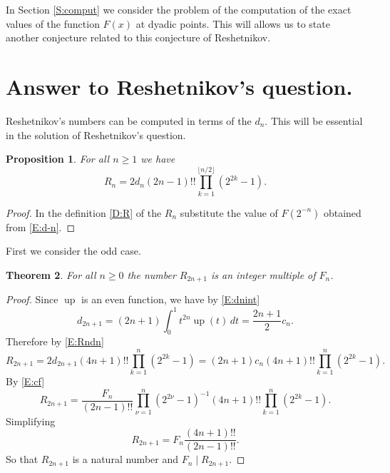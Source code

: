 \documentclass[10pt]{amsart}
\newtheorem{thm}{Theorem}
\newtheorem{prop}[thm]{Proposition}
\theoremstyle{definition}
\theoremstyle{remark}
\DeclareMathOperator\up{up}
\begin{document}
In Section \ref{S:comput} we consider the problem of the computation of 
the exact values of the function $F(x)$
at dyadic points. This will allows us to state another conjecture related to this 
conjecture of Reshetnikov. 





\section{Answer to Reshetnikov's question.}


Reshetnikov's numbers can be computed in terms of the $d_n$. This  will be 
essential in the solution of Reshetnikov's question.

\begin{prop}\label{P:Rndn}
For all $n\ge1$ we have
\begin{equation}\label{E:Rndn}
R_n=2d_n (2n-1)!! \prod_{k=1}^{\lfloor n/2\rfloor}(2^{2k}-1).
\end{equation}
\end{prop}

\begin{proof}
In the definition \eqref{D:R} of the $R_n$ substitute the value of 
$F(2^{-n})$ obtained from \eqref{E:d-n}.
\end{proof}



First we consider the odd case. 
\begin{thm}\label{T:6}
For all $n\ge0$ the number $R_{2n+1}$ is an integer multiple of $F_n$.
\end{thm}
\begin{proof}
Since $\up$ is an even function, we have by  \eqref{E:dnint}
\[d_{2n+1}=(2n+1)\int_0^1t^{2n}\up(t)\,dt=\frac{2n+1}{2}c_n.\]
Therefore by \eqref{E:Rndn}
\[R_{2n+1}=2d_{2n+1} (4n+1)!! \prod_{k=1}^{n}(2^{2k}-1)=(2n+1)c_n(4n+1)!! \prod_{k=1}^{n}(2^{2k}-1).\]
By \eqref{E:cf}
\[R_{2n+1}=\frac{F_n}{(2n-1)!!}\prod_{\nu=1}^n(2^{2\nu}-1)^{-1}
(4n+1)!! \prod_{k=1}^{n}(2^{2k}-1).\]
Simplifying 
\begin{equation}\label{E:RF}
R_{2n+1}=F_n\frac{(4n+1)!!}{(2n-1)!!}.
\end{equation}
So that $R_{2n+1}$ is a natural number and  $F_n\mid R_{2n+1}$.
\end{proof}
\end{document}
